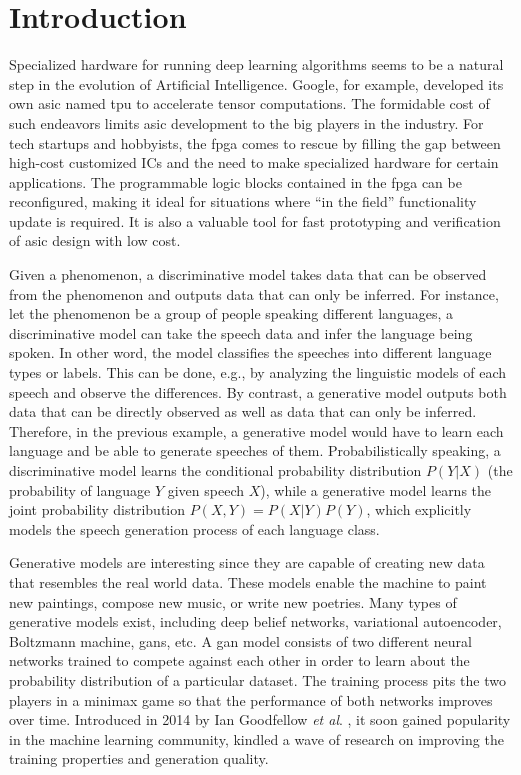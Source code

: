 
\chapter{Introduction}

Specialized hardware for running deep learning algorithms seems to be a natural step in the evolution of
Artificial Intelligence.  Google, for example, developed its own \gls{asic} named \gls{tpu}
to accelerate tensor computations. The formidable cost of such endeavors limits \gls{asic} development to
the big players in the industry. For tech startups and hobbyists, the \gls{fpga} comes to rescue by filling
the gap between high-cost customized ICs and the need to make specialized hardware for certain
applications. The programmable logic blocks contained in the \gls{fpga} can be reconfigured, making it
ideal for situations where "`in the field"' functionality update is required. It is also a valuable tool
for fast prototyping and verification of \gls{asic} design with low cost.

Given a phenomenon, a discriminative model takes data that can be observed from the phenomenon and outputs
data that can only be inferred. For instance, let the phenomenon be a group of people speaking different
languages, a discriminative model can take the speech data and infer the language being spoken. In other
word, the model classifies the speeches into different language types or labels. This can be done, e.g.,
by analyzing the linguistic models of each speech and observe the differences. By contrast, a generative
model outputs both data that can be directly observed as well as data that can only be inferred. Therefore,
in the previous example, a generative model would have to learn each language and be able to generate
speeches of them. Probabilistically speaking, a discriminative model learns the conditional probability
distribution $P(Y \vert X)$ (the probability of language $Y$ given speech $X$), while a generative model
learns the joint probability distribution $P(X,Y) = P(X \vert Y)P(Y)$, which explicitly models the speech
generation process of each language class.

Generative models are interesting since they are capable of creating new data that resembles the real world
data. These models enable the machine to paint new paintings, compose new music, or write new poetries.
Many types of generative models exist, including deep belief networks, variational autoencoder,
Boltzmann machine, \gls{gan}s, etc. A \gls{gan} model consists of two different neural networks trained to
compete against each other in order to learn about the probability distribution of a particular dataset.
The training process pits the two players in a minimax game so that the performance of both networks improves
over time. Introduced in 2014 by Ian Goodfellow \textit{et al}. \cite{goodfellow:gan}, it soon gained
popularity in the machine learning community, kindled a wave of research on improving the training properties
and generation quality.

